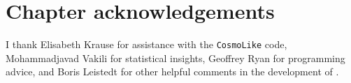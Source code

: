 
\section*{Chapter acknowledgements}

I thank Elisabeth Krause for assistance with the \texttt{CosmoLike} code, Mohammadjavad Vakili for statistical insights, Geoffrey Ryan for programming advice, and Boris Leistedt for other helpful comments in the development of \Chippr.
